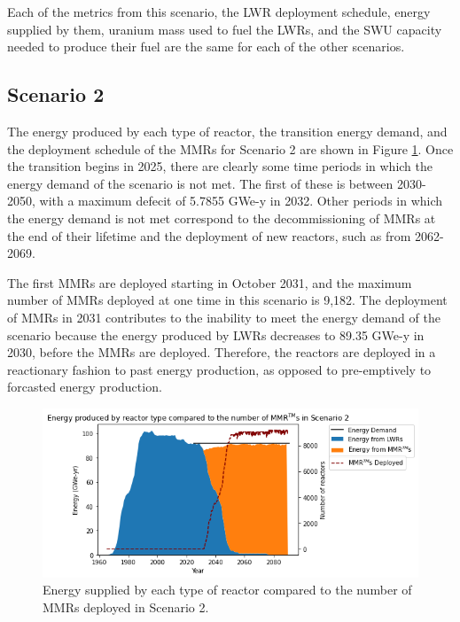 Each of the metrics from this scenario, the \gls{LWR} deployment schedule, 
energy supplied by them, uranium mass used to fuel the \glspl{LWR}, and the 
\gls{SWU} capacity needed to produce their fuel are the same for each of 
the other scenarios. 

\subsection{Scenario 2}
The energy produced by each type of reactor, the transition energy demand, 
and the deployment schedule of the \glspl{MMR} for Scenario 2 are shown in 
Figure \ref{fig:energy_rx_2}. Once the transition begins in 2025, there are 
clearly some time periods in which the energy demand of the scenario is 
not met. The first of these is between 2030-2050, with a maximum defecit 
of 5.7855 GWe-y in 2032. Other periods in which the energy demand is not met 
correspond to the decommissioning of \glspl{MMR} at the end of their lifetime 
and the deployment of new reactors, such as from 2062-2069. 

The first \glspl{MMR} are deployed starting in October 2031, and the 
maximum number of \glspl{MMR} deployed at one time in this scenario is 
9,182. The deployment of \glspl{MMR} in 2031 contributes to the inability to 
meet the energy demand of the scenario because the energy produced by 
\glspl{LWR} decreases to 89.35 GWe-y in 2030, before the \glspl{MMR} are 
deployed. Therefore, the reactors are deployed in a reactionary fashion to 
past energy production, as opposed to pre-emptively to forcasted energy 
production. 

\begin{figure}
    \centering 
    \includegraphics[scale=0.5]{figures/energy_scenario2.png}
    \caption{Energy supplied by each type of reactor compared to the number of 
    \glspl{MMR} deployed in Scenario 2.}
    \label{fig:energy_rx_2}
\end{figure}

